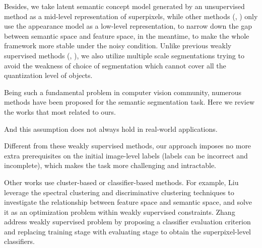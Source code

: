 Besides, we take latent semantic concept model generated by an unsupervised method as a mid-level representation of superpixels, while other methods (\eg, \cite{vezhnevets2011weakly,xu2014tell}) only use the appearance model as a low-level representation, to narrow down the gap between semantic space and feature space, in the meantime, to make the whole framework more stable under the noisy condition. Unlike previous weakly supervised methods (\eg, \cite{vezhnevets2012weakly,xu2014tell}), we also utilize multiple scale segmentations trying to avoid the weakness of choice of segmentation which cannot cover all the quantization level of objects.

\if
Being such a fundamental problem in computer vision community, numerous methods have been proposed for the semantic segmentation task. Here we review the works that most related to ours.

And this assumption does not always hold in real-world applications.

Different from these weakly supervised methods, our approach imposes no more extra prerequisites on the initial image-level labels (\eg labels can be incorrect and incomplete), which makes the task more challenging and intractable.

Other works use cluster-based or classifier-based methods. For example, Liu \etal \cite{liu2013weakly} leverage the spectral clustering and discriminative clustering techniques to investigate the relationship between feature space and semantic space, and solve it as an optimization problem within weakly supervised constraints. Zhang \etal \cite{zhang2013sparse} address weakly supervised problem by proposing a classifier evaluation criterion and replacing training stage with evaluating stage to obtain the superpixel-level classifiers.
\fi
